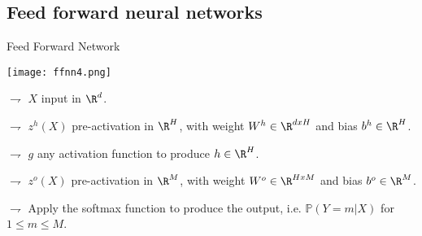 \documentclass[xcolor={usenames,dvipsnames}]{beamer}
\begin{document}
\subsection{Feed forward neural networks}

\begin{frame}{Feed Forward Network}

\begin{center}
\texttt{[image: ffnn4.png]}
\end{center}

$\rightharpoondown$ $X$ \alert{input in $\R^d$}.

$\rightharpoondown$ $z^h(X)$ \alert{pre-activation in $\R^H$}, with \alert{weight $W^h\in\R^{dxH}$} and \alert{bias $b^h\in\R^H$}.

$\rightharpoondown$ $g$ \alert{any activation function} to produce $h\in\R^H$.

$\rightharpoondown$ $z^o(X)$ \alert{pre-activation in $\R^M$}, with \alert{weight $W^o\in\R^{HxM}$} and \alert{bias $b^o\in\R^M$}.

$\rightharpoondown$  Apply the \alert{softmax function to produce the output}, i.e. $\mathbb{P}(Y=m|X)$ for $1\leqslant m \leqslant M$.
\end{frame}
\end{document}
